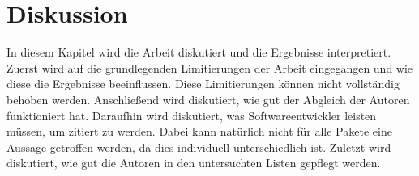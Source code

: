 
\chapter{Diskussion}
\label{chap:diskussion}
In diesem Kapitel wird die Arbeit diskutiert und die Ergebnisse interpretiert.
Zuerst wird auf die grundlegenden Limitierungen der Arbeit eingegangen und wie diese die Ergebnisse beeinflussen.
Diese Limitierungen können nicht vollständig behoben werden.
Anschließend wird diskutiert, wie gut der Abgleich der Autoren funktioniert hat.
Daraufhin wird diskutiert, was Softwareentwickler leisten müssen, um zitiert zu werden.
Dabei kann natürlich nicht für alle Pakete eine Aussage getroffen werden, da dies individuell unterschiedlich ist.
Zuletzt wird diskutiert, wie gut die Autoren in den untersuchten Listen gepflegt werden.

